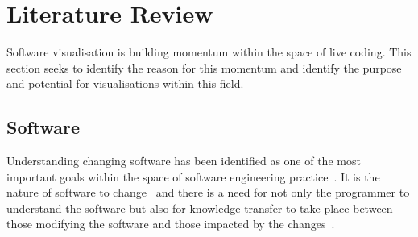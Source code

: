 
\chapter{Literature Review}
\label{chap:literature-review}

Software visualisation is building momentum within the space of live coding. This section seeks to identify the reason for this momentum and identify the purpose and potential for visualisations within this field.




\section{Software}

Understanding changing software has been identified as one of the most important goals within the space of software engineering practice~\cite{Tao2012}. It is the nature of software to change~\cite{Brooks1995} and there is a need for not only the programmer to understand the software but also for knowledge transfer to take place between those modifying the software and those impacted by the changes~\cite{Tao2012}.

